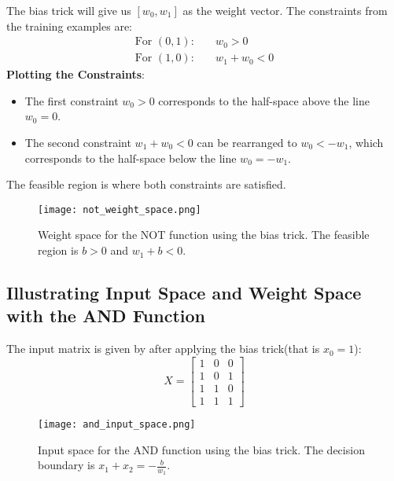The bias trick will give us \([w_{0}, w_{1}]\) as the weight vector. The constraints from the training examples are:
\begin{align}
\text{For }(0,1): & \quad w_{0} > 0 \\
\text{For }(1,0): & \quad w_{1} + w_{0} < 0
\end{align} 
\textbf{Plotting the Constraints}:
\begin{itemize}
    \item The first constraint \(w_{0} > 0\) corresponds to the half-space above the line \(w_{0} = 0\).
    \item The second constraint \(w_{1} + w_{0} < 0\) can be rearranged to \(w_{0} < -w_{1}\), which corresponds to the half-space below the line \(w_{0} = -w_{1}\).
\end{itemize}       
The feasible region is where both constraints are satisfied.

\begin{figure}[htbp]
    \centering
    \texttt{[image: not\_weight\_space.png]}
    \caption{Weight space for the NOT function using the bias trick. The feasible region is $b > 0$ and $w_1 + b < 0$.}
    \label{fig:not_weight_space}
\end{figure}

\subsection{Illustrating Input Space and Weight Space with the AND Function}
The input matrix is given by after applying the bias trick(that is $x_{0} = 1$):
\begin{equation}
X = \begin{bmatrix}
1 & 0 & 0 \\
1 & 0 & 1 \\
1 & 1 & 0 \\
1 & 1 & 1
\end{bmatrix}
\end{equation}      

\begin{figure}
    \centering
    \texttt{[image: and\_input\_space.png]}
    \caption{Input space for the AND function using the bias trick. The decision boundary is $x_1 + x_2 = -\frac{b}{w_1}$.}
    \label{fig:and_input_space}    
\end{figure}        
